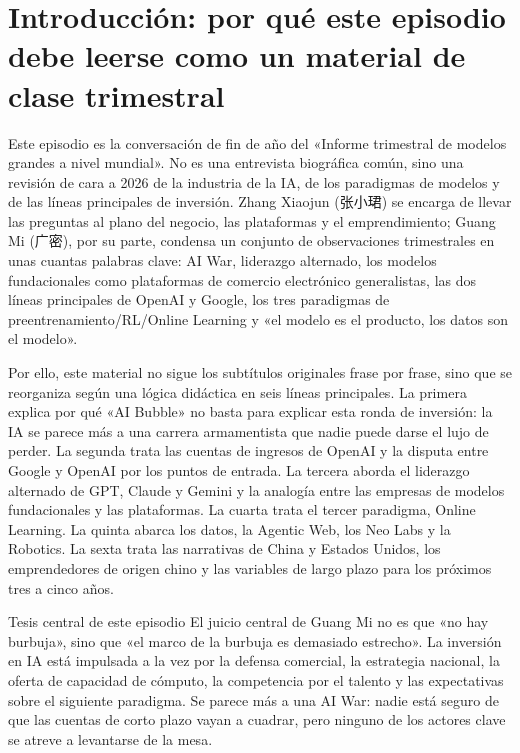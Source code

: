 \section{Introducción: por qué este episodio debe leerse como un material de clase trimestral}

Este episodio es la conversación de fin de año del «Informe trimestral de modelos grandes a nivel mundial». No es una entrevista biográfica común, sino una revisión de cara a 2026 de la industria de la IA, de los paradigmas de modelos y de las líneas principales de inversión. Zhang Xiaojun (张小珺) se encarga de llevar las preguntas al plano del negocio, las plataformas y el emprendimiento; Guang Mi (广密), por su parte, condensa un conjunto de observaciones trimestrales en unas cuantas palabras clave: AI War, liderazgo alternado, los modelos fundacionales como plataformas de comercio electrónico generalistas, las dos líneas principales de OpenAI y Google, los tres paradigmas de preentrenamiento/RL/Online Learning y «el modelo es el producto, los datos son el modelo».

Por ello, este material no sigue los subtítulos originales frase por frase, sino que se reorganiza según una lógica didáctica en seis líneas principales. La primera explica por qué «AI Bubble» no basta para explicar esta ronda de inversión: la IA se parece más a una carrera armamentista que nadie puede darse el lujo de perder. La segunda trata las cuentas de ingresos de OpenAI y la disputa entre Google y OpenAI por los puntos de entrada. La tercera aborda el liderazgo alternado de GPT, Claude y Gemini y la analogía entre las empresas de modelos fundacionales y las plataformas. La cuarta trata el tercer paradigma, Online Learning. La quinta abarca los datos, la Agentic Web, los Neo Labs y la Robotics. La sexta trata las narrativas de China y Estados Unidos, los emprendedores de origen chino y las variables de largo plazo para los próximos tres a cinco años.

\begin{importantbox}{Tesis central de este episodio}
El juicio central de Guang Mi no es que «no hay burbuja», sino que «el marco de la burbuja es demasiado estrecho». La inversión en IA está impulsada a la vez por la defensa comercial, la estrategia nacional, la oferta de capacidad de cómputo, la competencia por el talento y las expectativas sobre el siguiente paradigma. Se parece más a una AI War: nadie está seguro de que las cuentas de corto plazo vayan a cuadrar, pero ninguno de los actores clave se atreve a levantarse de la mesa.
\end{importantbox}

